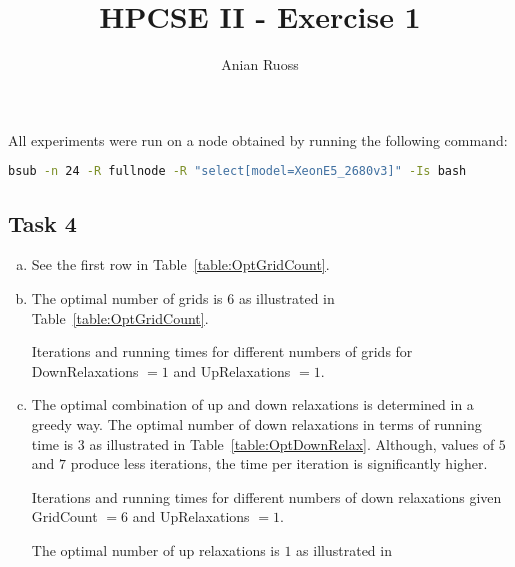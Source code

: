 \documentclass[11pt]{article}
\begin{document}
    \title{HPCSE II - Exercise 1}
    \author{Anian Ruoss}
    \maketitle

    All experiments were run on a node obtained by running the following
    command:
    \begin{lstlisting}[language=bash, basicstyle=\footnotesize]
bsub -n 24 -R fullnode -R "select[model=XeonE5_2680v3]" -Is bash
    \end{lstlisting}

    \subsection*{Task 4}
    \label{subsec:Task4}
    \begin{enumerate}[a)]
        \item See the first row in Table~\ref{table:OptGridCount}.
        \item The optimal number of grids is $6$ as illustrated
        in Table~\ref{table:OptGridCount}.
        \begin{table}[H]
            \caption{Iterations and running times for different numbers of
            grids for DownRelaxations $=1$ and UpRelaxations $=1$.}
            \begin{center}
                
            \end{center}
            \label{table:OptGridCount}
        \end{table}
        \item The optimal combination of up and down relaxations is
        determined in a greedy way.
        The optimal number of down relaxations in terms of running time is $3$
        as illustrated in Table~\ref{table:OptDownRelax}.
        Although, values of $5$ and $7$ produce less iterations, the time per
        iteration is significantly higher.
        \begin{table}[H]
            \caption{Iterations and running times for different numbers of
            down relaxations given GridCount $= 6$ and UpRelaxations $= 1$.}
            \begin{center}
                
            \end{center}
            \label{table:OptDownRelax}
        \end{table}
        The optimal number of up relaxations is $1$ as illustrated in

\end{enumerate}
\end{document}
